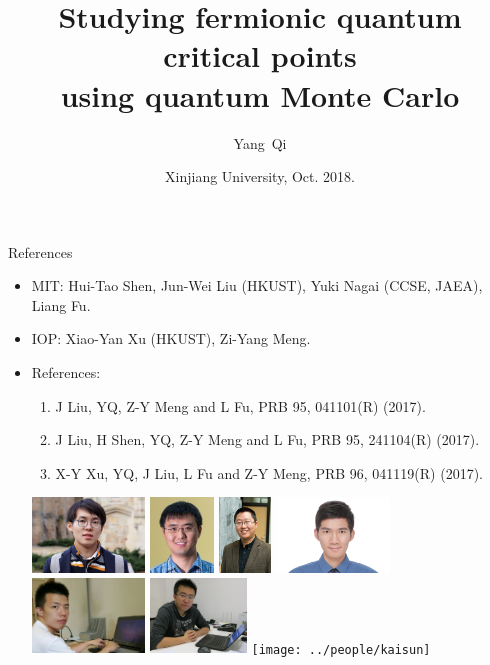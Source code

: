 \documentclass[xcolor=table, 10pt, aspectratio=43]{beamer}
\title[SMLC] %
{Studying fermionic quantum critical points\\ using quantum Monte Carlo}
\author[Y Qi] %
{Yang~Qi}
\institute[Fudan] %
{Department of Physics, Fudan University}
\date{Xinjiang University, Oct. 2018.}
\begin{document}
\begin{frame}
  \titlepage
\end{frame}

\begin{frame}{References}
\begin{itemize}
\item MIT: Hui-Tao Shen, Jun-Wei Liu (HKUST), Yuki Nagai (CCSE, JAEA), Liang Fu.
\item IOP: Xiao-Yan Xu (HKUST), Zi-Yang Meng.
\item References:
\begin{enumerate}
  \item J Liu, YQ, Z-Y Meng and L Fu, PRB 95, 041101(R) (2017).
  \item J Liu, H Shen, YQ, Z-Y Meng and L Fu, PRB 95, 241104(R) (2017).
  \item X-Y Xu, YQ, J Liu, L Fu and Z-Y Meng, PRB 96, 041119(R) (2017).
\end{enumerate}
\begin{center}
	\includegraphics[height=2cm]{../people/huitaoshen}
	\includegraphics[height=2cm]{../people/junweiliu}
	\includegraphics[height=2cm]{../people/liangfu}
	\includegraphics[height=2cm]{../people/xiaoyanxu}\\
   \includegraphics[height=2cm]{../people/zihongliu}
	\includegraphics[height=2cm]{../people/ziyangmeng}
	\texttt{[image: ../people/kaisun]}
\end{center}
\end{itemize}
\end{frame}
\end{document}
